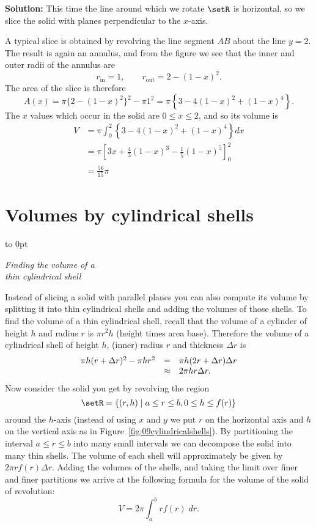 \textbf{Solution: } This time the line around which we rotate $\setR$ is
horizontal, so we slice the solid with planes perpendicular to the $x$-axis.

A typical slice is obtained by revolving the line segment $AB$ about the line
$y=2$.  The result is again an annulus, and from the figure we see that the
inner and outer radii of the annulus are
\[
r_{\textrm{in}} = 1,\qquad r_{\textrm{out}} = 2-(1-x)^2.
\]
The area of the slice is therefore
\[
A(x) = \pi \bigl\{2-(1-x)^2\bigr\}^2-\pi 1^2 = \pi\left\{ 3-4(1-x)^2+(1-x)^4
\right\}.
\]
The $x$ values which occur in the solid are $0\leq x\leq2$, and so its volume is
\begin{align*}
  V &= \pi\int_0^2\left\{ 3-4(1-x)^2+(1-x)^4 \right\}dx\\
  &=\pi\left[ 3x+\tfrac43(1-x)^3-\tfrac15(1-x)^5 \right]_0^2\\
  &=\tfrac{56}{15}\pi
\end{align*}


\section{Volumes by cylindrical shells}

\vbox to 0pt{\centering%
  

  \footnotesize\sffamily\itshape Finding the volume of a\\
  thin cylindrical shell }  Instead of slicing a
solid with parallel planes you can also compute its volume by splitting it into
thin cylindrical shells and adding the volumes of those shells.  To find the
volume of a thin cylindrical shell, recall that the volume of a cylinder of
height $h$ and radius $r$ is $\pi r^2h$ (height times area base).  Therefore the
volume of a cylindrical shell of height $h$, (inner) radius $r$ and thickness
$\Delta r$ is
\[\displayindent140pt \displaywidth220pt
\begin{array}{rcl}
  \pi h(r+\Delta r)^2 - \pi hr^2
  &=&\pi h (2r+\Delta r) \Delta r\\
  &\approx& 2\pi h r \Delta r.
\end{array}
\]
Now consider the solid you get by revolving the region
\[\displayindent140pt \displaywidth220pt
\setR = \left\{ (r, h) \mid a\leq r\leq b, 0\leq h\leq f(r) \right\}
\]
around the $h$-axis (instead of using $x$ and $y$ we put $r$ on the horizontal
axis and $h$ on the vertical axis as in Figure~\ref{fig:09cylindricalshells}).
By partitioning the interval $a\leq r \leq b$ into many small intervals we can
decompose the solid into many thin shells.  The volume of each shell will
approximately be given by $2\pi rf(r)\Delta r$.  Adding the volumes of the
shells, and taking the limit over finer and finer partitions we arrive at the
following formula for the volume of the solid of revolution:
\begin{equation}
  V = 2\pi\int_a^b rf(r) \;dr.
\end{equation}


